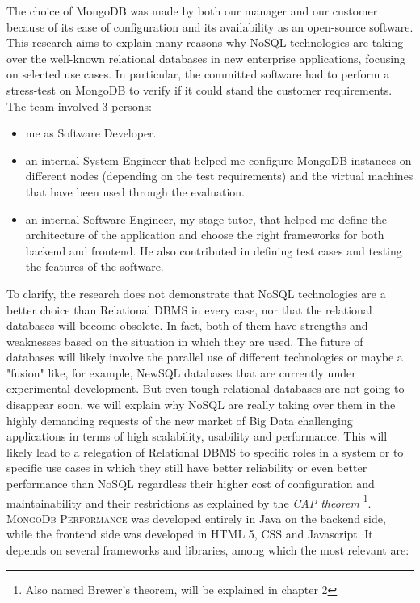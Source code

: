 The choice of MongoDB was made by both our manager and our customer because of its ease of configuration and its availability as 
an open-source software.
This research aims to explain many reasons why NoSQL technologies are taking over the well-known relational databases in new enterprise applications, focusing on selected use cases.
In particular, the committed software had to perform a stress-test on MongoDB to verify if it could stand the customer requirements.
The team involved 3 persons:
\begin{itemize}
  \item me as Software Developer.
  \item an internal System Engineer that helped me configure MongoDB instances on different nodes (depending on the test requirements) and the virtual machines that have been used through the evaluation.
  \item an internal Software Engineer, my stage tutor, that helped me define the architecture of the application and choose the right frameworks for both backend and frontend. He also contributed in defining test cases and testing the features of the software.
\end{itemize}
To clarify, the research does not demonstrate that NoSQL technologies are a better choice than Relational DBMS in every case, nor that the relational databases will become obsolete.
In fact, both of them have strengths and weaknesses based on the situation in which they are used.
The future of databases will likely involve the parallel use of different technologies or maybe a "fusion" like, for example, NewSQL databases that are currently under experimental development.
But even tough relational databases are not going to disappear soon, we will explain why NoSQL are really taking over them in the highly demanding requests of the new market of Big Data challenging applications in terms of high scalability, usability and performance.
This will likely lead to a relegation of Relational DBMS to specific roles in a system or to specific use cases in which they still have better reliability or even better performance than NoSQL regardless their higher cost of configuration and maintainability and their restrictions as explained by the \textit{CAP theorem} \footnote{Also named Brewer's theorem, will be explained in chapter 2}.
\textsc{MongoDb Performance} was developed entirely in Java on the backend side, while the frontend side was developed in HTML 5, CSS and Javascript.
It depends on several frameworks and libraries, among which the most relevant are:
